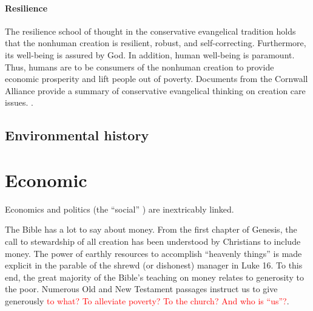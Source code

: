 \documentclass[12pt]{article}
\newcommand{\ins}[1]{\textcolor{red}{#1}}
\begin{document}
\paragraph{Resilience} 
\label{sec:resilience}

The resilience school of thought in the conservative evangelical tradition
holds that the nonhuman creation is resilient, robust, and self-correcting.
Furthermore, its well-being is assured by God.
In addition, human well-being is paramount. 
Thus, humans are to be consumers of the nonhuman creation 
to provide economic prosperity and
lift people out of poverty.
Documents from the Cornwall Alliance 
provide a summary of conservative evangelical thinking on creation care issues.
\autocite{Cornwall:2006aa}.







%
%
%



\subsection{Environmental history}
\label{sec:environmental_history}


\section{Economic}
\label{sec:economic}
Economics and politics (the ``social'' ) are inextricably linked.

The Bible has a lot to say about money. From the first chapter of Genesis, the call to
stewardship of all creation has been understood by Christians to include money. The power
of earthly resources to accomplish ``heavenly things'' is made explicit in the parable of
the shrewd (or dishonest) manager in Luke 16. To this end, the great majority of the
Bible's teaching on money relates to generosity to the poor. Numerous Old and New
Testament passages instruct us to give generously 
\ins{to what? To alleviate poverty? To the church?  And who is ``us''?}.
\end{document}
